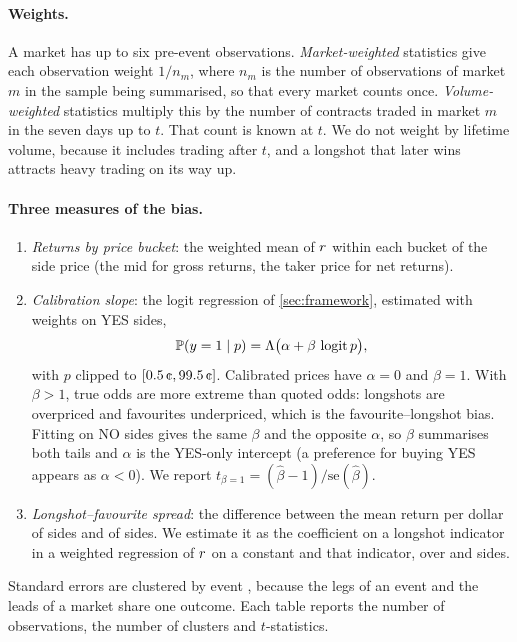 \paragraph{Weights.}
A market has up to six pre-event observations. \emph{Market-weighted} statistics give each
observation weight $1/n_m$, where $n_m$ is the number of observations of market $m$ in the sample
being summarised, so that every market counts once. \emph{Volume-weighted} statistics multiply this
by the number of contracts traded in market $m$ in the seven days up to $t$. That count is known at
$t$. We do not weight by lifetime volume, because it includes trading after $t$, and a longshot
that later wins attracts heavy trading on its way up.

\paragraph{Three measures of the bias.}
\begin{enumerate}
\item \emph{Returns by price bucket}: the weighted mean of $r$ within each bucket of the side price
      (the mid for gross returns, the taker price for net returns).
\item \emph{Calibration slope}: the logit regression of \cref{sec:framework}, estimated with weights
      on YES sides,
      \begin{equation}\label{eq:xs-logit}
        \mathbb{P}(y=1\mid p)=\Lambda\bigl(\alpha+\beta\,\operatorname{logit}p\bigr),
      \end{equation}
      with $p$ clipped to $[0.5\cents,99.5\cents]$. Calibrated prices have $\alpha=0$ and $\beta=1$.
      With $\beta>1$, true odds are more extreme than quoted odds: longshots are overpriced and
      favourites underpriced, which is the favourite--longshot bias. Fitting on NO sides gives the
      same $\beta$ and the opposite $\alpha$, so $\beta$ summarises both tails and $\alpha$ is the
      YES-only intercept (a preference for buying YES appears as $\alpha<0$). We report
      $t_{\beta=1}=(\hat\beta-1)/\mathrm{se}(\hat\beta)$.
\item \emph{Longshot--favourite spread}: the difference between the mean return per dollar of
      \LS{} sides and of \FAV{} sides. We estimate it as the coefficient on a longshot indicator in a
      weighted regression of $r$ on a constant and that indicator, over \LS{} and \FAV{} sides.
\end{enumerate}
Standard errors are clustered by event \citep{cameronmiller2015}, because the legs of an event and the
leads of a market share one outcome. Each table reports the number of observations, the number of
clusters and $t$-statistics.

